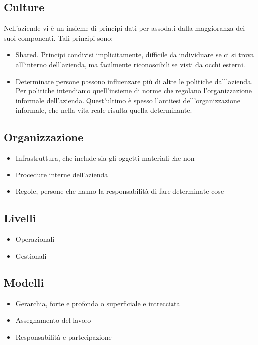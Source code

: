 \subsection{Culture}
Nell'aziende vi \`e un insieme di principi dati per assodati dalla maggioranza dei suoi componenti. Tali principi sono:
\begin{itemize}
\item Shared. Principi condivisi implicitamente, difficile da individuare se ci si trova all'interno dell'azienda, ma facilmente riconoscibili se visti da occhi esterni.
\item Determinate persone possono influenzare pi\`u di altre le politiche dall'azienda. Per politiche intendiamo quell'insieme di norme che regolano l'organizzazione informale dell'azienda. Quest'ultimo \`e spesso l'antitesi dell'organizzazione informale, che nella vita reale risulta quella determinante.
\end{itemize}
\subsection{Organizzazione}
\begin{itemize}
	\item Infrastruttura, che include sia gli oggetti materiali che non
	\item Procedure interne dell'azienda
	\item Regole, persone che hanno la responsabilità di fare determinate cose
\end{itemize}
\subsection{Livelli}
\begin{itemize}
	\item Operazionali
	\item Gestionali
\end{itemize}
\subsection{Modelli}
\begin{itemize}
	\item Gerarchia, forte e profonda o superficiale e intrecciata
	\item Assegnamento del lavoro
	\item Responsabilità e partecipazione
\end{itemize}
